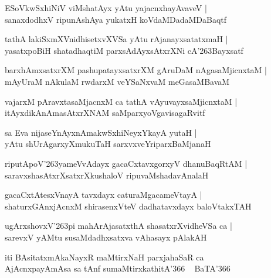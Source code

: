 \documentclass[twoside,12pt,openright]{book}
\def\S{\char'263}
\newcounter{shloka}[chapter]
\begin{document}
\begin{shloka}%
ESoVkwSxhiNiV viMshatAyx yAtu yajacnxhayAvaveV |\\
sanaxdodhxV ripunAshAya yukatxH koVdaMDadaMDaBaqtf 
\end{shloka}

\begin{shloka}%
tathA lakiSxmXVnidhisetxvXVSa yAtu rAjanayxsatatxmaH |\\
yasatxpoBiH shatadhaqtiM parxsAdAyxsAtxrXNi cA\S Bayxsatf 
\end{shloka}

\begin{shloka}%
barxhAmxsatxrXM pashupatayxsatxrXM gAruDaM nAgasaMjicnxtaM |\\
mAyUraM nAkulaM rwdarxM veYSaNxvaM meGasaMBavaM 
\end{shloka}

\begin{shloka}%
vajarxM pAravxtasaMjacnxM ca tathA vAyuvayxsaMjicnxtaM |\\
itAyxdikAnAmasAtxrXNAM saMparxyoVgavisagaRvitf 
\end{shloka}

\begin{shloka}%
sa Eva nijaseYnAyxnAmakwSxhiNeyxYkayA yutaH |\\
yAtu shUrAgarxyXmukuTaH sarxvxveYriparxBaMjanaH
\end{shloka}

\begin{shloka}%
riputApoV\S yameVvAdayx gacaCxtavxgorxyV dhanuBaqRtAM |\\
saravxshasAtxrXsatxrXkushaloV ripuvaMshadavAnalaH 
\end{shloka}

\begin{shloka}%
gacaCxtAtesxVnayA tavxdayx caturaMgacameVtayA |\\
shaturxGAnxjAcnxM shirasenxVteV dadhatavxdayx baloVtakxTAH 
\end{shloka}

\begin{shloka}%
ugArxshovxV\S pi mahArAjasatxthA shasatxrXvidheVSa ca |\\
sarevxV yAMtu susaMdadhxsatxva vAhasayx pAlakAH 
\end{shloka}

\begin{shloka}%
iti BAsitatxmAkaNayxR maMtirxNaH parxjahaSaR ca \\
AjAcnxpayAmAsa sa tAnf sumaMtirxkathitA\char'366 ~ BaTA\char'366
\end{shloka}
\end{document}
